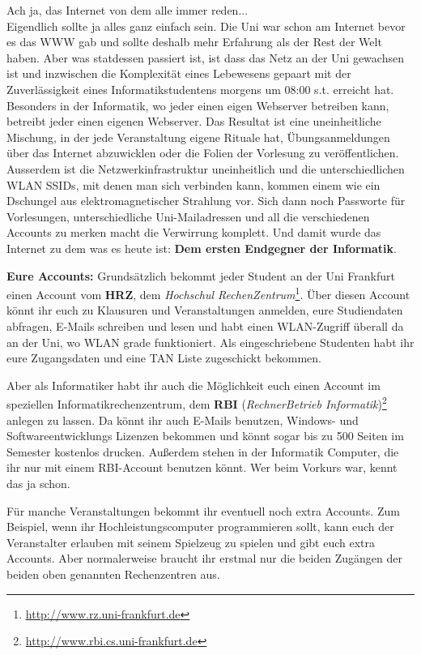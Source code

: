 Ach ja, das Internet von dem alle immer reden...\\

\spaltenanfang
Eigendlich sollte ja alles ganz einfach sein.
Die Uni war schon am Internet bevor es das WWW gab und sollte deshalb mehr Erfahrung als der Rest der Welt haben.
Aber was statdessen passiert ist, ist dass das Netz an der Uni gewachsen ist und inzwischen die Komplexit\"at eines Lebewesens gepaart mit der Zuverl\"assigkeit eines Informatikstudentens morgens um 08:00 s.t. erreicht hat. Besonders in der Informatik, wo jeder einen eigen Webserver betreiben kann, betreibt jeder einen eigenen Webserver. Das Resultat ist eine uneinheitliche Mischung, in der jede Veranstaltung eigene Rituale hat, \"Ubungsanmeldungen \"uber das Internet abzuwicklen oder die Folien der Vorlesung zu ver\"offentlichen. Ausserdem ist die Netzwerkinfrastruktur uneinheitlich und die unterschiedlichen WLAN SSIDs, mit denen man sich verbinden kann, kommen einem wie ein Dschungel aus elektromagnetischer Strahlung vor. Sich dann noch Passworte f\"ur Vorlesungen, unterschiedliche Uni-Mailadressen und all die verschiedenen Accounts zu merken macht die Verwirrung komplett.  Und damit wurde das Internet zu dem was es heute ist: \textbf{Dem ersten Endgegner der Informatik}.

\textbf{Eure Accounts:}
Grunds\"atzlich bekommt jeder Student an der Uni Frankfurt einen Account vom \textbf{HRZ}, dem \textit{Hochschul RechenZentrum}\footnote{\url{http://www.rz.uni-frankfurt.de}}.
\"Uber diesen Account k\"onnt ihr euch zu Klausuren und Veranstaltungen anmelden, eure Studiendaten abfragen, E-Mails schreiben und lesen und habt einen WLAN-Zugriff \"uberall da an der Uni, wo WLAN grade funktioniert. Als eingeschriebene Studenten habt ihr eure Zugangsdaten und eine TAN Liste zugeschickt bekommen. 

Aber als Informatiker habt ihr auch die M\"oglichkeit euch einen Account im speziellen Informatikrechenzentrum, dem \textbf{RBI} (\textit{RechnerBetrieb Informatik})\footnote{\url{http://www.rbi.cs.uni-frankfurt.de}} anlegen zu lassen. Da k\"onnt ihr auch E-Mails benutzen, Windows- und Softwareentwicklungs Lizenzen bekommen und k\"onnt sogar bis zu 500 Seiten im Semester kostenlos drucken. Au{\ss}erdem stehen in der Informatik Computer, die ihr nur mit einem RBI-Account benutzen k\"onnt. Wer beim Vorkurs war, kennt das ja schon.

F\"ur manche Veranstaltungen bekommt ihr eventuell noch extra Accounts. Zum Beispiel, wenn ihr Hochleistungscomputer programmieren sollt, kann euch der Veranstalter erlauben mit seinem Spielzeug zu spielen und gibt euch extra Accounts. Aber normalerweise braucht ihr erstmal nur die beiden Zug\"angen der beiden oben genannten Rechenzentren aus.

